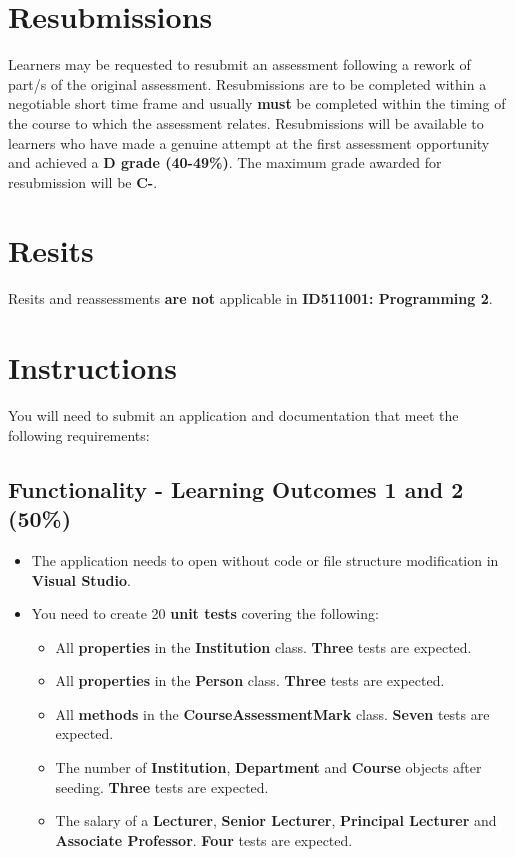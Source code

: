 \documentclass{article}
\begin{document}
\section*{Resubmissions}
Learners may be requested to resubmit an assessment following a rework of part/s of the original assessment. Resubmissions are to be completed within a negotiable short time frame and usually \textbf{must} be completed within the timing of the course to which the assessment relates. Resubmissions will be available to learners who have made a genuine attempt at the first assessment opportunity and achieved a \textbf{D grade (40-49\%)}. The maximum grade awarded for resubmission will be \textbf{C-}.

\section*{Resits}
Resits and reassessments \textbf{are not} applicable in \textbf{ID511001: Programming 2}.

\section*{Instructions}
You will need to submit an application and documentation that meet the following requirements:\\

\subsection*{Functionality - Learning Outcomes 1 and 2 (50\%)}
\begin{itemize}
    \item The application needs to open without code or file structure modification in \textbf{Visual Studio}.
    \item You need to create 20 \textbf{unit tests} covering the following:
    \begin{itemize}
        \item All \textbf{properties} in the \textbf{Institution} class. \textbf{Three} tests are expected.
        \item All \textbf{properties} in the \textbf{Person} class. \textbf{Three} tests are expected.
        \item All \textbf{methods} in the \textbf{CourseAssessmentMark} class. \textbf{Seven} tests are expected.
        \item The number of \textbf{Institution}, \textbf{Department} and \textbf{Course} objects after seeding. \textbf{Three} tests are expected.
        \item The salary of a \textbf{Lecturer}, \textbf{Senior Lecturer}, \textbf{Principal Lecturer} and \textbf{Associate Professor}. \textbf{Four} tests are expected.
    \end{itemize}
\end{itemize}
\end{document}
